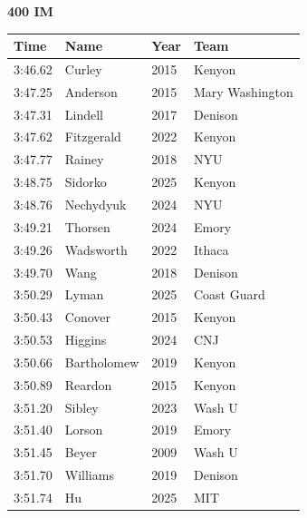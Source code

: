 \noindent\begin{minipage}[t]{0.98\textwidth}
\centering
\textbf{\textcolor{teamprimary}{400 IM}}\par
\vspace{0.5em}
\centering
\small
\renewcommand{\arraystretch}{1.0}
\setlength{\tabcolsep}{4pt}
\begin{tabular}{@{}p{2.5cm}p{4.5cm}p{1.5cm}p{2.5cm}@{}}
\toprule
\textbf{Time} & \textbf{Name} & \textbf{Year} & \textbf{Team} \\
\midrule
3:46.62 & Curley & 2015 & Kenyon \\
3:47.25 & Anderson & 2015 & Mary Washington \\
3:47.31 & Lindell & 2017 & Denison \\
3:47.62 & Fitzgerald & 2022 & Kenyon \\
3:47.77 & Rainey & 2018 & NYU \\
3:48.75 & Sidorko & 2025 & Kenyon \\
3:48.76 & Nechydyuk & 2024 & NYU \\
3:49.21 & Thorsen & 2024 & Emory \\
3:49.26 & Wadsworth & 2022 & Ithaca \\
3:49.70 & Wang & 2018 & Denison \\
3:50.29 & Lyman & 2025 & Coast Guard \\
3:50.43 & Conover & 2015 & Kenyon \\
3:50.53 & Higgins & 2024 & CNJ \\
3:50.66 & Bartholomew & 2019 & Kenyon \\
3:50.89 & Reardon & 2015 & Kenyon \\
3:51.20 & Sibley & 2023 & Wash U \\
3:51.40 & Lorson & 2019 & Emory \\
3:51.45 & Beyer & 2009 & Wash U \\
3:51.70 & Williams & 2019 & Denison \\
3:51.74 & Hu & 2025 & MIT \\
\bottomrule
\end{tabular}
\end{minipage}
\vspace{1.2em}
